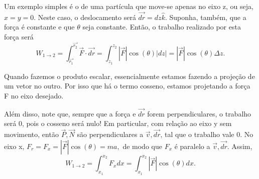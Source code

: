 \documentclass[physics_notes.tex]{subfiles}
\begin{document}
\begin{example}
	Um exemplo simples é o de uma partícula que move-se apenas no eixo z, ou seja,
	\(x = y = 0.\) Neste caso, o deslocamento será \(\vec{dr} = dz \hat{k}\). Suponha,
	também, que a força é constante e que \(\theta \) seja constante. Então, o
	trabalho realizado por esta força será
	\[
		W_{1\rightarrow2} = \int_{\vec{r_{1}}}^{\vec{r_{2}}}\vec{F}\cdot \vec{dr} = \int_{z_{1}}^{z_{2}}|\vec{F}|\cos{(\theta )}|dz| = |\vec{F}|\cos{(\theta )}\Delta z.
	\]
\end{example}
Quando fazemos o produto escalar, essencialmente estamos fazendo a projeção de um
vetor no outro. Por isso que há o termo cosseno, estamos projetando a força F
no eixo desejado.

Além disso, note que, sempre que a força e \(\vec{dr}\) forem perpendiculares,
o trabalho será 0, pois o cosseno será nulo! Em particular, com relação
ao eixo y sem movimento, então \(\vec{P}, \vec{N}\) são perpendiculares a \(\vec{v}, \vec{dr}\), tal que
o trabalho vale 0. No eixo x, \(F_{r} = F_{x} = |\vec{F}|\cos{(\theta )} = ma,\)
de modo que \(F_{x}\) é paralelo a \(\vec{v}, \vec{dr}\). Assim,
\[
	W_{1\rightarrow 2} = \int_{x_{1}}^{x_{2}}F_{x}dx = \int_{x_{1}}^{x_{2}}|\vec{F}|\cos{(\theta )}dx.
\]
\end{document}
